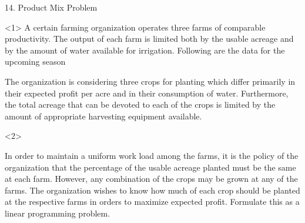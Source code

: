 \begin{frameExample}{14. Product Mix Problem}{}
  \begin{onlyenv}<1>
    A certain farming organization operates three farms of comparable productivity. The output of each farm is limited both by the usable acreage and by the amount of water available for irrigation. Following are the data for the upcoming season

  {\centering
  \par}
  The organization is considering three crops for planting which differ primarily in their expected profit per acre and in their consumption of water. Furthermore, the total acreage that can be devoted to each of the crops is limited by the amount of appropriate harvesting equipment available.
\end{onlyenv}

\begin{onlyenv}<2>
  {\centering
    \par}

  In order to maintain a uniform work load among the farms, it is the policy of the organization that the percentage of the usable acreage planted must be the same at each farm. However, any combination of the crops may be grown at any of the farms. The organization wishes to know how much of each crop should be planted at the respective farms in orders to maximize expected profit. Formulate this as a linear programming problem.
\end{onlyenv}
\end{frameExample}


